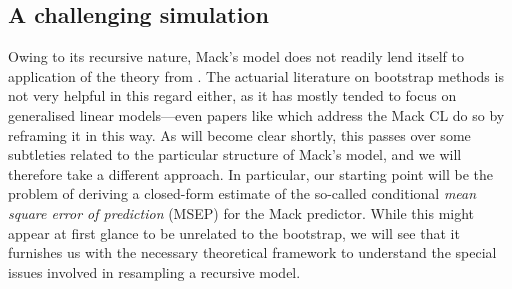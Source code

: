 \documentclass[a4paper]{book}
\begin{document}
\subsection{A challenging simulation} \label{subsec:mack-challenge}

Owing to its recursive nature, Mack's model does not readily lend itself to application of the theory from . The actuarial literature on bootstrap methods is not very helpful in this regard either, as it has mostly tended to focus on generalised linear models---even papers like \cite{england:dist} which address the Mack CL do so by reframing it in this way. As will become clear shortly, this passes over some subtleties related to the particular structure of Mack's model, and we will therefore take a different approach. In particular, our starting point will be the problem of deriving a closed-form estimate of the so-called conditional \emph{mean square error of prediction} (MSEP) for the Mack predictor. While this might appear at first glance to be unrelated to the bootstrap, we will see that it furnishes us with the necessary theoretical framework to understand the special issues involved in resampling a recursive model.
\end{document}
